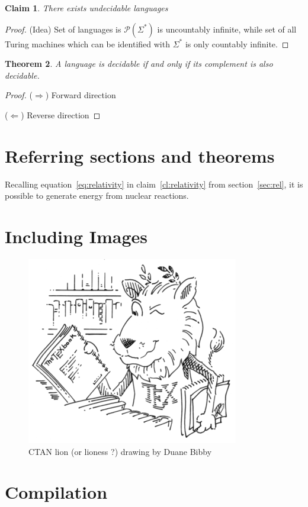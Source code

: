 \documentclass[10pt,a4paper]{article}
\newtheorem{theorem}{Theorem}
\newtheorem{claim}[theorem]{Claim}
\begin{document}
\begin{claim} 
There exists  undecidable languages
\end{claim}
\begin{proof}(Idea)
Set of languages is $\mathcal{P}(\Sigma^*)$ is uncountably infinite,
while set of all Turing machines which can be identified with 
$\Sigma^*$ is only countably infinite. 

\end{proof}
\begin{theorem}
A language is decidable if and only if its complement is also decidable.
\end{theorem}

\begin{proof}
($\Longrightarrow$) Forward direction

($\Longleftarrow$) Reverse direction

\end{proof}



\section{Referring sections and theorems}
Recalling equation~\ref{eq:relativity} in claim~\ref{cl:relativity} from section~\ref{sec:rel},
it is possible to generate energy from nuclear reactions.


\section{Including Images}

\begin{figure}[htp!]
\centering
\includegraphics[scale=0.7]{tex-lion}
\caption{CTAN lion (or lioness ?) drawing by Duane Bibby}
\end{figure}


\section{Compilation}
\end{document}
